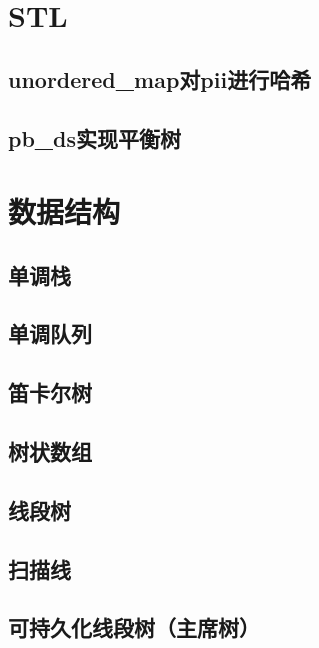 \documentclass{article}
\begin{document}
\begin{titlepage}

\thispagestyle{empty}
\pagebreak
\pagestyle{plain}
\tableofcontents
\end{titlepage}

\section{STL}

\subsection{unordered\_map对pii进行哈希}

\subsection{pb\_ds实现平衡树}


\section{数据结构}
\subsection{单调栈}
\subsection{单调队列}
\subsection{笛卡尔树}
\subsection{树状数组}
\subsection{线段树}
\subsection{扫描线}
\subsection{可持久化线段树（主席树）}
\end{document}
